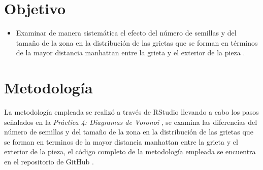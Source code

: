 \documentclass[a4paper]{article}
\begin{document}
\section{Objetivo}  %
\begin{itemize}   %
    \item Examinar de manera sistemática el efecto del número de semillas y del tamaño de la zona en la distribución de las grietas que se forman en términos de la mayor distancia manhattan entre la grieta y el exterior de la pieza \cite{p3}.

\end{itemize}

\section{Metodología}
\justify
La metodología empleada se realizó a través de RStudio \cite{RStudio} llevando a cabo los pasos señalados en la \textit{Práctica 4: Diagramas de Voronoi} \cite{p3}, se examina las diferencias del número de semillas y del tamaño de la zona en la distribución de las grietas que se forman en terminos de la mayor distancia manhattan entre la grieta y el exterior de la pieza, el código completo de la metodología empleada se encuentra en el repositorio de GitHub \cite{gitadrian}.
\end{document}
